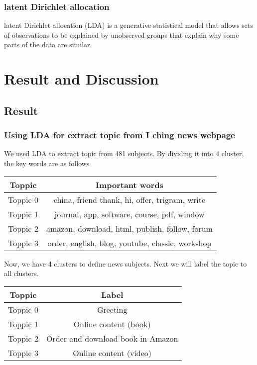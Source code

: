 \documentclass[conference]{IEEEtran}
\begin{document}
\subsubsection{latent Dirichlet allocation} 
latent Dirichlet allocation (LDA) is a generative statistical model that allows sets of observations to be explained by unobserved groups that explain why some parts of the data are similar.






\section{Result and Discussion}
\subsection{Result}
\subsubsection{Using LDA for extract topic from I ching news webpage}
We used LDA to extract topic from 481 subjects. By dividing it into 4 cluster, the key words are as follows
\begin{center}
	\begin{tabular}{ |c|c| } 
		\hline
		Toppic & Important words  \\
		\hline 
		Toppic 0 & china, friend thank, hi, offer, trigram, write\\
		\hline 
		Toppic 1 & journal, app, software, course, pdf, window \\ 
		\hline
		Toppic 2 & amazon, download, html, publish, follow, forum  \\ 
		\hline
		Toppic 3 & order, english, blog, youtube, classic, workshop \\ 
		\hline
	\end{tabular}
\end{center}

Now, we have 4 clusters to define news subjects. Next we will label the topic to all clusters.

\begin{center}
	\begin{tabular}{ |c|c| } 
		\hline
		Toppic & Label  \\
		\hline 
		Toppic 0 & Greeting\\
		\hline 
		Toppic 1 & Online content (book) \\ 
		\hline
		Toppic 2 & Order and download book in Amazon\\ 
		\hline
		Toppic 3 & Online content (video) \\ 
		\hline
	\end{tabular}
\end{center}
\end{document}
